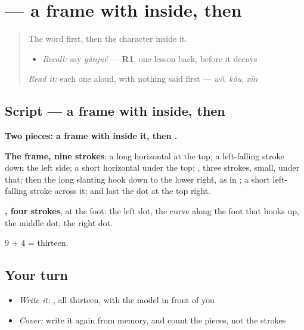 \section[\texorpdfstring{\zh{感} (gǎn)}{感 (gǎn)}]{ — a frame with  inside, then }

\label{lesson:ZH-W286-gan}



\begin{quote}
The word first, then the character inside it.

\begin{itemize}
\raggedright
  \item \emph{Recall:} say \emph{gǎnjué} — \textbf{R1}, one lesson back, before it decays
\end{itemize}

\begin{quote}
  
\end{quote}

\emph{Read it:} each one aloud, with nothing said first — \emph{wǒ}, \emph{kǒu}, \emph{xīn}
\end{quote}

\subsection*{Script — a frame with  inside, then }

\begin{quote}
\end{quote}

\textbf{Two pieces: a frame with  inside it, then .}

\textbf{The frame, nine strokes}: a long horizontal at the top; a left-falling stroke down the left side; a short horizontal under the top; , three strokes, small, under that; then the long slanting hook down to the lower right, as in ; a short left-falling stroke across it; and last the dot at the top right.

\textbf{, four strokes}, at the foot: the left dot, the curve along the foot that hooks up, the middle dot, the right dot.

9 + 4 = thirteen.

\subsection*{Your turn}
\begin{itemize}
\raggedright
  \item \emph{Write it:} , all thirteen, with the model in front of you
  \item \emph{Cover:} write it again from memory, and count the pieces, not the strokes
\end{itemize}

